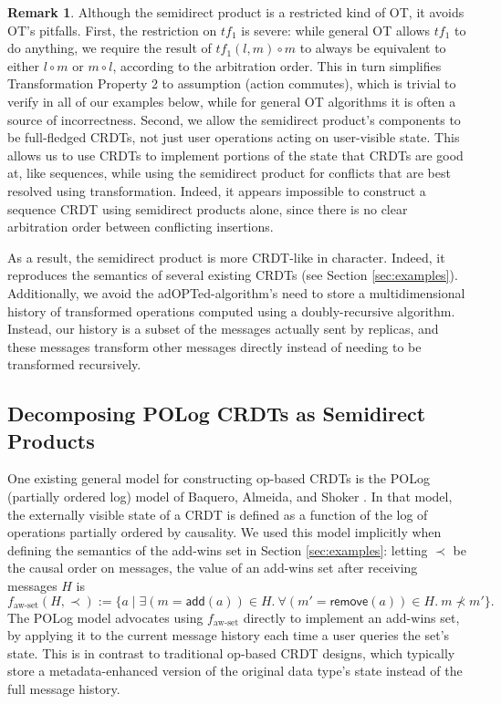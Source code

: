 \documentclass[acmsmall,nonacm,12pt]{acmart}
\newcommand{\msf}[1]{\ensuremath{\mathsf{#1}}}
\theoremstyle{plain}
\theoremstyle{definition}
\newtheorem{myrmk}[mythm]{Remark}
\begin{document}
\begin{myrmk}
Although the semidirect product is a restricted kind of OT, it avoids OT's pitfalls.  First, the restriction on $tf_1$ is severe: while general OT allows $tf_1$ to do anything, we require the result of $tf_1(l, m) \circ m$ to always be equivalent to either $l \circ m$ or $m \circ l$, according to the arbitration order.  This in turn simplifies Transformation Property 2 to assumption (action commutes), which is trivial to verify in all of our examples below, while for general OT algorithms it is often a source of incorrectness.  Second, we allow the semidirect product's components to be full-fledged CRDTs, not just user operations acting on user-visible state.  This allows us to use CRDTs to implement portions of the state that CRDTs are good at, like sequences, while using the semidirect product for conflicts that are best resolved using transformation.  Indeed, it appears impossible to construct a sequence CRDT using semidirect products alone, since there is no clear arbitration order between conflicting insertions.

As a result, the semidirect product is more CRDT-like in character.  Indeed, it reproduces the semantics of several existing CRDTs (see Section \ref{sec:examples}).  Additionally, we avoid the adOPTed-algorithm's need to store a multidimensional history of transformed operations computed using a doubly-recursive algorithm.  Instead, our history is a subset of the messages actually sent by replicas, and these messages transform other messages directly instead of needing to be transformed recursively.
\end{myrmk}


\subsection{Decomposing POLog CRDTs as Semidirect Products}
One existing general model for constructing op-based CRDTs is the POLog (partially ordered log) model of Baquero, Almeida, and Shoker \cite{pure_op_based_crdts_extended}.  In that model, the externally visible state of a CRDT is defined as a function of the log of operations partially ordered by causality.  We used this model implicitly when defining the semantics of the add-wins set in Section \ref{sec:examples}: letting $\prec$ be the causal order on messages, the value of an add-wins set after receiving messages $H$ is
\[
f_{\text{aw-set}}(H, \prec) := \{a \mid \exists (m = \msf{add}(a)) \in H.\ \forall(m' = \msf{remove}(a)) \in H.\ m \nprec m'\}.
\]
The POLog model advocates using $f_{\text{aw-set}}$ directly to implement an add-wins set, by applying it to the current message history each time a user queries the set's state.  This is in contrast to traditional op-based CRDT designs, which typically store a metadata-enhanced version of the original data type's state instead of the full message history.
\end{document}
